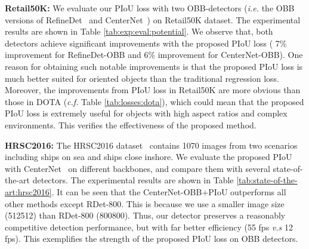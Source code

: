 \noindent\textbf{Retail50K:}
We evaluate our PIoU loss with two OBB-detectors (\textit{i.e.} the OBB versions of RefineDet~\cite{refinedet} and CenterNet~\cite{Zhou2019OAP}) on Retail50K dataset. The experimental results are shown in Table \ref{tab:exp:eval:potential}. We observe that, both detectors achieve significant improvements with the proposed PIoU loss ( 7\% improvement for RefineDet-OBB and  6\% improvement for CenterNet-OBB). One reason for obtaining such notable improvements is that the proposed PIoU loss is much better suited for oriented objects than the traditional regression loss. Moreover, the improvements from PIoU loss in Retail50K are more obvious than those in DOTA (\textit{c.f.} Table \ref{tab:losses:dota}), which could mean that the proposed PIoU loss is extremely useful for objects with high aspect ratios and complex environments. This verifies the effectiveness of the proposed method.

\noindent\textbf{HRSC2016:}
The HRSC2016 dataset~\cite{Liu2016SRB} contains 1070 images from two scenarios including ships on sea and ships close inshore. We evaluate the proposed PIoU with CenterNet~\cite{Zhou2019OAP} on different backbones, and compare them with several state-of-the-art detectors. The experimental results are shown in Table \ref{tab:state-of-the-art:hrsc2016}. It can be seen that the CenterNet-OBB+PIoU outperforms all other methods except RDet-800. This is because we use a smaller image size (512512) than RDet-800 (800800). Thus, our detector preserves a reasonably competitive detection performance, but with far better efficiency (55 fps \textit{v.s} 12 fps). This exemplifies the strength of the proposed PIoU loss on OBB detectors.

